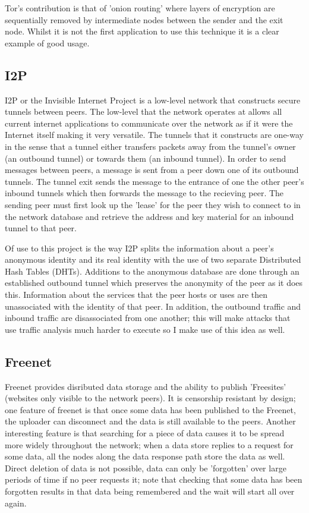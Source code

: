 \documentclass[ %
                    author={Luke Murray},
                supervisor={Dr. Simon Hollis},
                     title={Shadow Peer-to-Peer Networks},
                  subtitle={},
                    degree={MEng},
                      year={2013} ]{thesis}
\begin{document}
Tor's contribution is that of 'onion routing' where layers of encryption are sequentially removed by intermediate nodes between the sender and the exit node. Whilst it is not the first application to use this technique it is a clear example of good usage. 

\subsection{I2P}

I2P\cite{I2P} or the Invisible Internet Project is a low-level network that constructs secure tunnels between peers. The low-level that the network operates at allows all current internet applications to communicate over the network as if it were the Internet itself making it very versatile. The tunnels that it constructs are one-way in the sense that a tunnel either transfers packets away from the tunnel's owner (an outbound tunnel) or towards them (an inbound tunnel). In order to send messages between peers, a message is sent from a peer down one of its outbound tunnels. The tunnel exit sends the message to the entrance of one the other peer's inbound tunnels which then forwards the message to the recieving peer. The sending peer must first look up the 'lease' for the peer they wish to connect to in the network database and retrieve the address and key material for an inbound tunnel to that peer.

Of use to this project is the way I2P splits the information about a peer's anonymous identity and its real identity with the use of two separate Distributed Hash Tables (DHTs). Additions to the anonymous database are done through an established outbound tunnel which preserves the anonymity of the peer as it does this. Information about the services that the peer hosts or uses are then unassociated with the identity of that peer. In addition, the outbound traffic and inbound traffic are disassociated from one another; this will make attacks that use traffic analysis much harder to execute so I make use of this idea as well.

\subsection{Freenet}

Freenet\cite{Freeenet} provides disributed data storage and the ability to publish 'Freesites' (websites only visible to the network peers). It is censorship resistant by design; one feature of freenet is that once some data has been published to the Freenet, the uploader can disconnect and the data is still available to the peers. Another interesting feature is that searching for a piece of data causes it to be spread more widely throughout the network; when a data store replies to a request for some data, all the nodes along the data response path store the data as well. Direct deletion of data is not possible, data can only be 'forgotten' over large periods of time if no peer requests it; note that checking that some data has been forgotten results in that data being remembered and the wait will start all over again.
\end{document}
